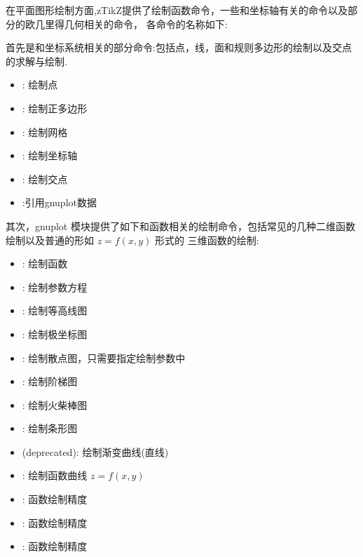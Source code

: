 在平面图形绘制方面,zTikZ提供了绘制函数命令，一些和坐标轴有关的命令以及部分的欧几里得几何相关的命令，
各命令的名称如下:

首先是和坐标系统相关的部分命令:包括点，线，面和规则多边形的绘制以及交点的求解与绘制.
\begin{itemize}
    \item \cmd{\ShowPoint}\index{\cmd{\ShowPoint}}: 绘制点
    \item \cmd{\Polygon}\index{\cmd{\Polygon}}: 绘制正多边形
    \item \cmd{\ShowGrid}\index{\cmd{\ShowGrid}}: 绘制网格 
    \item \cmd{\ShowAxis}\index{\cmd{\ShowAxis}}: 绘制坐标轴
    \item \cmd{\ShowIntersection}\index{\cmd{\ShowIntersection}}: 绘制交点
    \item \cmd{\gnudata}\index{\cmd{\gnudata}}:引用gnuplot数据
\end{itemize}

其次，gnuplot 模块提供了如下和函数相关的绘制命令，包括常见的几种二维函数绘制以及普通的形如 $z=f(x,y)$ 形式的
三维函数的绘制:
\begin{itemize}
  \item \cmd{\Plot}\index{\cmd{\Plot}}: 绘制函数
  \item \cmd{\ParamPlot}\index{\cmd{\ParamPlot}}: 绘制参数方程
  \item \cmd{\ContourPlot}\index{\cmd{\ContourPlot}}: 绘制等高线图
  \item \cmd{\PolarPlot}\index{\cmd{\PolarPlot}}: 绘制极坐标图
  \item \cmd{\ListPlot}\index{\cmd{\ListPlot}}: 绘制散点图，只需要指定绘制参数中
  \item \cmd{\StairsPlot}\index{\cmd{\StairsPlot}}: 绘制阶梯图
  \item \cmd{\StemPlot}\index{\cmd{\StemPlot}}: 绘制火柴棒图
  \item \cmd{\BarPlot}\index{\cmd{\BarPlot}}: 绘制条形图
  \item \cmd{\ShadePlot}(deprecated)\index{\cmd{\ShadePlot}}: 绘制渐变曲线(直线)
  \item \cmd{\Plotz}\index{\cmd{\Plotz}}: 绘制函数曲线 $z=f(x, y)$
            \item \cmd{\PlotPrecise}\index{\cmd{\PlotPrecise}}: 函数绘制精度
            \item \cmd{\PlotPrecise}\index{\cmd{\PlotPrecise}}: 函数绘制精度
  \item \cmd{\PlotPrecise}\index{\cmd{\PlotPrecise}}: 函数绘制精度
\end{itemize}


